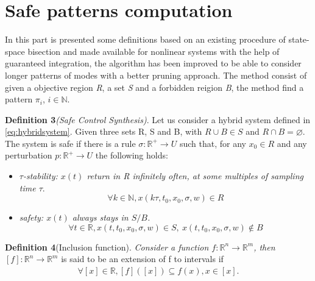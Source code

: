   \section{Safe patterns computation}
  \label{sec:safepatterncomputation}
    In this part is presented some definitions based on an existing 
    procedure of state-space bisection and made available for nonlinear 
    systems  with the help of guaranteed integration, the algorithm has
    been  improved to be able to consider longer patterns of modes with a better
    pruning approach. The method consist of given a objective region 
    \emph{R}, a set \emph{S} and a forbidden reigion \emph{B}, the method find a pattern $\pi_i$, $i \in 
    \mathbb{N}$. \cite{le2016distributed}

    
    
  
    \textbf{Definition 3}\emph{(Safe Control Synthesis)}. Let us 
    consider a hybrid system defined in \autoref{eq:hybridsystem}. Given three sets R, S and B, 
    with ${R \cup B \in S}$  and ${R \cap B = \varnothing }$. %
    The system is safe if there is a rule ${\sigma : \mathbb{R}^+ \rightarrow U}$ such that, 
    for any ${x_0 \in R }$ and any perturbation $p : \mathbb{R}^+ \rightarrow U$
    the following holds: 

    \begin{itemize}
        \item \emph{ ${\tau}$-stability: ${x(t)}$ return in R 
        infinitely often, at some multiples of sampling time ${\tau}$}.
        \begin{equation}
          \forall k \in \mathbb{N}, x(k\tau, t_0,x_0,\sigma,w) \in R
        \end{equation}
        \item \emph{ safety: ${x(t)}$ always stays in ${S/B}$.}        
        \begin{equation}
          \forall t \in \mathbb{R}, x(t, t_0,x_0,\sigma,w) \in S, \
          x(t, t_0,x_0,\sigma,w) \notin B
        \end{equation}
    \end{itemize}

    \textbf{Definition 4}(Inclusion function). \emph{Consider a function 
    $f :\mathbb{R}^n \rightarrow \mathbb{R}^m$, then $[f]:\mathbb{R}^n \rightarrow \mathbb{R}^m$}
    is said to be an extension of f to intervals if
    \begin{eqnarray*}
      \forall [x] \in \mathbb{R}, [f]([x]) \subseteq {f(x), x \in [x]}.      
    \end{eqnarray*}

